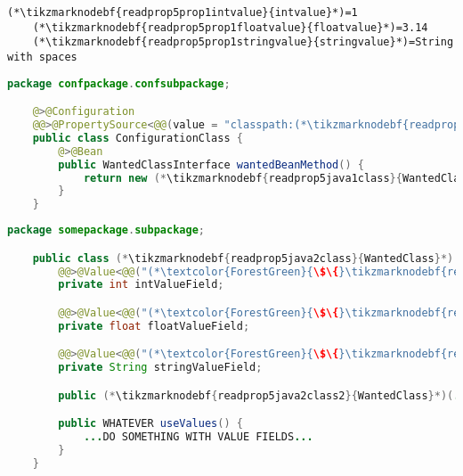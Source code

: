 \begin{lstlisting}[title={A \mboxtextit{.properties} file called \tikzmarknodebf{readprop5prop1filename}{\textit{annotations.properties}}}]
    (*\tikzmarknodebf{readprop5prop1intvalue}{intvalue}*)=1
    (*\tikzmarknodebf{readprop5prop1floatvalue}{floatvalue}*)=3.14
    (*\tikzmarknodebf{readprop5prop1stringvalue}{stringvalue}*)=String with spaces
\end{lstlisting}
\begin{lstlisting}[language=Java, title={Configuration class}]
    package confpackage.confsubpackage;

    @>@Configuration
    @@>@PropertySource<@@(value = "classpath:(*\tikzmarknodebf{readprop5java1filename}{annotations.properties}[ForestGreen]*)", encoding = "utf-8")
    public class ConfigurationClass {
        @>@Bean
        public WantedClassInterface wantedBeanMethod() {
            return new (*\tikzmarknodebf{readprop5java1class}{WantedClass}*)(...);
        }
    }
\end{lstlisting}
\begin{lstlisting}[language=Java, title={Wanted class with any constructor}]
    package somepackage.subpackage;

    public class (*\tikzmarknodebf{readprop5java2class}{WantedClass}*) implements WantedClassInterface {
        @@>@Value<@@("(*\textcolor{ForestGreen}{\$\{}\tikzmarknodebf{readprop5java2intvalue}{intvalue}[ForestGreen]\textcolor{ForestGreen}{\}}*)")
        private int intValueField;

        @@>@Value<@@("(*\textcolor{ForestGreen}{\$\{}\tikzmarknodebf{readprop5java2floatvalue}{floatvalue}[ForestGreen]\textcolor{ForestGreen}{\}}*)")
        private float floatValueField;

        @@>@Value<@@("(*\textcolor{ForestGreen}{\$\{}\tikzmarknodebf{readprop5java2stringvalue}{stringvalue}[ForestGreen]\textcolor{ForestGreen}{\}}*)")
        private String stringValueField;

        public (*\tikzmarknodebf{readprop5java2class2}{WantedClass}*)(...) {...}

        public WHATEVER useValues() {
            ...DO SOMETHING WITH VALUE FIELDS...
        }
    }
\end{lstlisting}
\newpage
